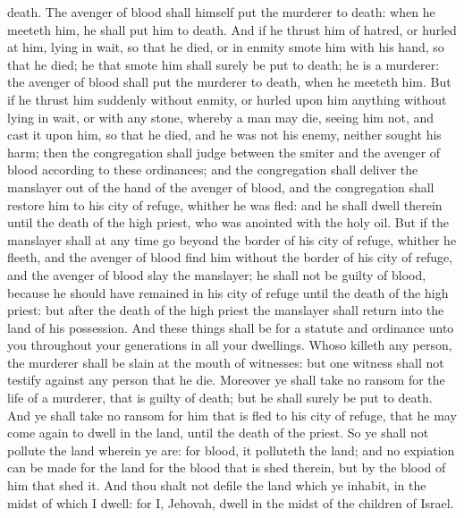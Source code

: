 death. The avenger of blood shall himself put the murderer to death: when he meeteth him, he shall put him to death. And if he thrust him of hatred, or hurled at him, lying in wait, so that he died, or in enmity smote him with his hand, so that he died; he that smote him shall surely be put to death; he is a murderer: the avenger of blood shall put the murderer to death, when he meeteth him.  But if he thrust him suddenly without enmity, or hurled upon him anything without lying in wait, or with any stone, whereby a man may die, seeing him not, and cast it upon him, so that he died, and he was not his enemy, neither sought his harm; then the congregation shall judge between the smiter and the avenger of blood according to these ordinances; and the congregation shall deliver the manslayer out of the hand of the avenger of blood, and the congregation shall restore him to his city of refuge, whither he was fled: and he shall dwell therein until the death of the high priest, who was anointed with the holy oil. But if the manslayer shall at any time go beyond the border of his city of refuge, whither he fleeth, and the avenger of blood find him without the border of his city of refuge, and the avenger of blood slay the manslayer; he shall not be guilty of blood, because he should have remained in his city of refuge until the death of the high priest: but after the death of the high priest the manslayer shall return into the land of his possession.  And these things shall be for a statute and ordinance unto you throughout your generations in all your dwellings. Whoso killeth any person, the murderer shall be slain at the mouth of witnesses: but one witness shall not testify against any person that he die. Moreover ye shall take no ransom for the life of a murderer, that is guilty of death; but he shall surely be put to death. And ye shall take no ransom for him that is fled to his city of refuge, that he may come again to dwell in the land, until the death of the priest. So ye shall not pollute the land wherein ye are: for blood, it polluteth the land; and no expiation can be made for the land for the blood that is shed therein, but by the blood of him that shed it. And thou shalt not defile the land which ye inhabit, in the midst of which I dwell: for I, Jehovah, dwell in the midst of the children of Israel. 

